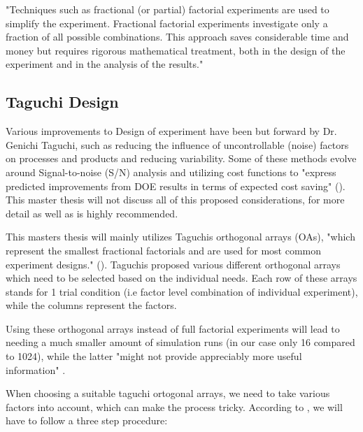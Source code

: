 "Techniques such as fractional (or partial) factorial experiments are used to simplify the experiment. Fractional factorial experiments investigate only a fraction of all possible combinations. This approach saves considerable time and money but requires rigorous mathematical treatment, both in the design of the experiment and in the analysis of the results." \cite{roy_primer_1990} 


\subsection{Taguchi Design}
Various improvements to Design of experiment have been but forward by Dr. Genichi Taguchi, such as reducing the influence of uncontrollable (noise) factors on processes and products and reducing variability. Some of these methods evolve around Signal-to-noise (S/N) analysis and utilizing cost functions to "express predicted improvements from DOE results in terms of expected cost saving" (\cite{roy_primer_1990}). This master thesis will not discuss all of this proposed considerations, for more detail \cite{roy_primer_1990} as well as \cite{yang_design_2009} is highly recommended.

This masters thesis will mainly utilizes Taguchis orthogonal arrays (OAs), "which represent the smallest fractional factorials and are used for most common experiment designs." (\cite{roy_primer_1990}).
Taguchis proposed various different orthogonal arrays which need to be selected based on the individual needs. Each row of these arrays stands for 1 trial condition (i.e factor level combination of individual experiment), while the columns represent the factors.


Using these orthogonal arrays instead of full factorial experiments will lead to needing a much smaller amount of simulation runs (in our case only 16 compared to 1024), while the latter "might not provide appreciably more useful information" \cite{roy_primer_1990}.



When choosing a suitable taguchi ortogonal arrays, we need to take various factors into account, which can make the process tricky. According to \cite{yang_design_2009}, we will have to follow a three step procedure:

